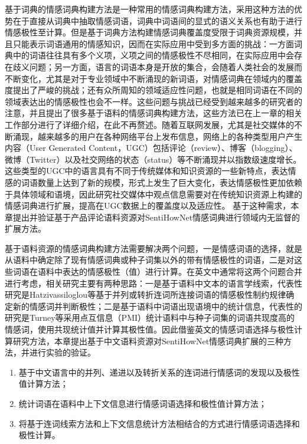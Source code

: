 基于词典的情感词典构建方法是一种常用的情感词典构建方法，采用这种方法的优势在于直接从词典中抽取情感词语，词典中词语间的显式的语义关系也有助于进行情感极性至计算。但是基于词典方法构建情感词典覆盖度受限于词典资源规模，并且只能表示词语通用的情感知识，因而在实际应用中受到多方面的挑战：一方面词典中的词语往往具有多个义项，义项之间的情感极性不尽相同，在实际应用中会存在歧义问题；另一方面，语言的词语本身是开放的集合，会随着人类社会的发展而不断变化，尤其是对于专业领域中不断涌现的新词语，对情感词典在领域内的覆盖度提出了严峻的挑战；还有众所周知的领域适应性问题，也就是相同词语在不同的领域表达出的情感极性也会不一样。这些问题与挑战已经受到越来越多的研究者的注意，并且提出了很多基于语料的情感词典构建方法，这些方法已在上一章的相关工作部分进行了详细介绍，在此不再赘述。随着互联网发展，尤其是社交媒体的不断涌现，越来越多的用户在各种网络平台上发布信息，网络上的各种类型用户产生内容（User Generated Content，UGC）包括评论（review）、博客（blogging）、微博（Twitter）以及社交网络的状态（status）等不断涌现并以指数级速度增长。这些类型的UGC中的语言具有不同于传统媒体和知识资源的一些新特点，表达情感的词语数量上达到了新的规模，形式上发生了巨大变化，表达情感极性更加依赖于具体领域和语境，因此研究社交媒体中观点信息需要对在传统知识资源上构建的情感词典进行扩展，提高在UGC数据上的覆盖度以及适应性。
基于这种需求，本章提出并验证基于产品评论语料资源对SentiHowNet情感词典进行领域内无监督的扩展方法。

基于语料资源的情感词典构建方法需要解决两个问题，一是情感词语的选择，就是从语料中确定除了现有情感词典或种子词集以外的带有情感极性的词语，二是对这些词语在语料中表达的情感极性（值）进行计算。在英文中通常将这两个问题合并进行考虑，相关研究主要有两种思路：一是基于语料中文本的语言学线索，代表性研究是Hatzivassiloglou等基于并列或转折连词所连接词语的情感极性制约规律确定新的情感词并判断极性；二是基于语料中词语出现语境中的统计信息，代表性的研究是Turney等采用点互信息（PMI）统计语料中与种子词集的词语共现度高的情感词，使用共现统计值并计算其极性值。因此借鉴英文的情感词语选择与极性计算研究方法，本章提出基于中文语料资源对SentiHowNet情感词典扩展的三种方法，并进行实验的验证。
\begin{enumerate}
\item 基于中文语言中的并列、递进以及转折关系的连词进行情感词的发现以及极性值计算方法；
\item 统计词语在语料中上下文信息进行情感词语选择和极性值计算方法；
\item 将基于连词线索方法和上下文信息统计方法相结合的方式进行情感词语选择和极性计算。
\end{enumerate}

